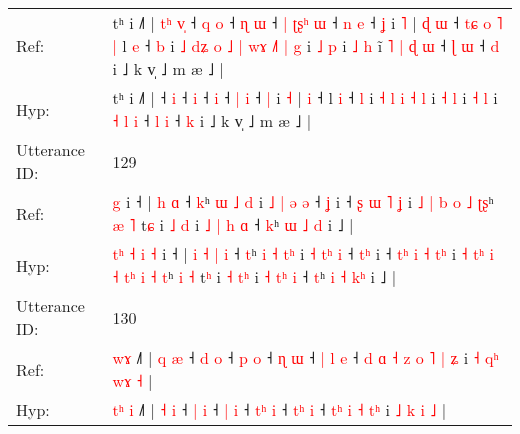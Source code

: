\documentclass[10pt]{article}
\DeclareRobustCommand{\hl}[1]{{\textcolor{red}{#1}}}
\begin{document}
\begin{longtable}{ll}
Ref: & tʰ i ˩˥ |\hl{ }\hl{t}\hl{ʰ}\hl{ }\hl{v}\hl{̩} ˧\hl{ }\hl{q} \hl{o} ˧\hl{ }\hl{ɳ} \hl{ɯ} ˧\hl{ }\hl{|}\hl{ }\hl{ʈ}\hl{ʂ}\hl{ʰ} \hl{ɯ} ˧ \hl{n} \hl{e} ˧ \hl{ʝ} i \hl{˥} |\hl{ }\hl{ɖ} \hl{ɯ} ˧\hl{ }\hl{t}\hl{ɕ}\hl{ }\hl{o}\hl{ }\hl{˥}\hl{ }\hl{|} l \hl{e} ˧ \hl{b} i\hl{ }\hl{˩}\hl{ }\hl{d}\hl{ʑ}\hl{ }\hl{o}\hl{ }\hl{˩} \hl{|} \hl{w}\hl{ɤ} \hl{˩}\hl{˥} \hl{|} \hl{g} i \hl{˩} \hl{p} i \hl{˩} \hl{h} i\hl{̃}\hl{ }\hl{˥} \hl{|} \hl{ɖ} \hl{ɯ} ˧ \hl{ɭ} \hl{ɯ} ˧ \hl{d} i ˩ k v̩ ˩ m æ ˩ |
 \\
Hyp: & tʰ i ˩˥ |\hl{}\hl{}\hl{}\hl{}\hl{}\hl{} ˧\hl{}\hl{} \hl{i} ˧\hl{}\hl{} \hl{i} ˧\hl{}\hl{}\hl{}\hl{}\hl{}\hl{} \hl{i} ˧ \hl{|} \hl{i} ˧ \hl{|} i \hl{˧} |\hl{}\hl{} \hl{i} ˧\hl{}\hl{}\hl{}\hl{}\hl{}\hl{}\hl{}\hl{}\hl{} l \hl{i} ˧ \hl{l} i\hl{}\hl{}\hl{}\hl{}\hl{}\hl{}\hl{}\hl{}\hl{} \hl{˧} \hl{}\hl{l} \hl{}\hl{i} \hl{˧} \hl{l} i \hl{˧} \hl{l} i \hl{˧} \hl{l} i\hl{}\hl{}\hl{} \hl{˧} \hl{l} \hl{i} ˧ \hl{l} \hl{i} ˧ \hl{k} i ˩ k v̩ ˩ m æ ˩ |
 \\
\midrule
Utterance ID: & 129 \\
Ref: & \hl{}\hl{}\hl{}\hl{}\hl{}\hl{}\hl{}\hl{g} i ˧ |\hl{}\hl{}\hl{}\hl{} \hl{h} \hl{ɑ} ˧ \hl{k}ʰ \hl{ɯ} \hl{˩} \hl{}\hl{d} i \hl{˩} \hl{|}\hl{ }\hl{ə} \hl{ə} ˧ \hl{}\hl{ʝ} i ˧ \hl{}\hl{ʂ} \hl{ɯ} \hl{˥} \hl{}\hl{ʝ} i\hl{}\hl{} \hl{}\hl{˩} \hl{|} \hl{b} \hl{}\hl{o} \hl{˩} \hl{}\hl{ʈ}\hl{ʂ}ʰ \hl{æ} \hl{˥} t\hl{ɕ} i \hl{˩} \hl{}\hl{d} i \hl{˩} \hl{|}\hl{ }\hl{h} \hl{ɑ} ˧ \hl{k}ʰ \hl{ɯ} \hl{˩} \hl{}\hl{d} i ˩ |
 \\
Hyp: & \hl{t}\hl{ʰ}\hl{ }\hl{˧}\hl{ }\hl{i}\hl{ }\hl{˧} i ˧ |\hl{ }\hl{i}\hl{ }\hl{˧} \hl{|} \hl{i} ˧ \hl{t}ʰ \hl{i} \hl{˧} \hl{t}\hl{ʰ} i \hl{˧} \hl{}\hl{t}\hl{ʰ} \hl{i} ˧ \hl{t}\hl{ʰ} i ˧ \hl{t}\hl{ʰ} \hl{i} \hl{˧} \hl{t}\hl{ʰ} i\hl{ }\hl{˧} \hl{t}\hl{ʰ} \hl{i} \hl{˧} \hl{t}\hl{ʰ} \hl{i} \hl{˧}\hl{ }\hl{t}ʰ \hl{i} \hl{˧} t\hl{ʰ} i \hl{˧} \hl{t}\hl{ʰ} i \hl{˧} \hl{}\hl{t}\hl{ʰ} \hl{i} ˧ \hl{t}ʰ \hl{i} \hl{˧} \hl{k}\hl{ʰ} i ˩ |
 \\
\midrule
Utterance ID: & 130 \\
Ref: & \hl{}\hl{}\hl{w}\hl{ɤ} ˩˥ | \hl{q} \hl{æ} ˧ \hl{d} \hl{o} ˧ \hl{p} \hl{o} ˧ \hl{}\hl{ɳ} \hl{ɯ} ˧ \hl{|}\hl{ }\hl{l} \hl{e} ˧\hl{ }\hl{d}\hl{ }\hl{ɑ} \hl{˧}\hl{ }\hl{z} \hl{o} \hl{˥} \hl{|}\hl{ }\hl{ʑ} i \hl{˧} \hl{q}\hl{ʰ} \hl{w}\hl{ɤ} \hl{˧} |
 \\
Hyp: & \hl{t}\hl{ʰ}\hl{ }\hl{i} ˩˥ | \hl{˧} \hl{i} ˧ \hl{|} \hl{i} ˧ \hl{|} \hl{i} ˧ \hl{t}\hl{ʰ} \hl{i} ˧ \hl{}\hl{t}\hl{ʰ} \hl{i} ˧\hl{}\hl{}\hl{}\hl{} \hl{}\hl{t}\hl{ʰ} \hl{i} \hl{˧} \hl{}\hl{t}\hl{ʰ} i \hl{˩} \hl{}\hl{k} \hl{}\hl{i} \hl{˩} |

\end{longtable}
\end{document}
